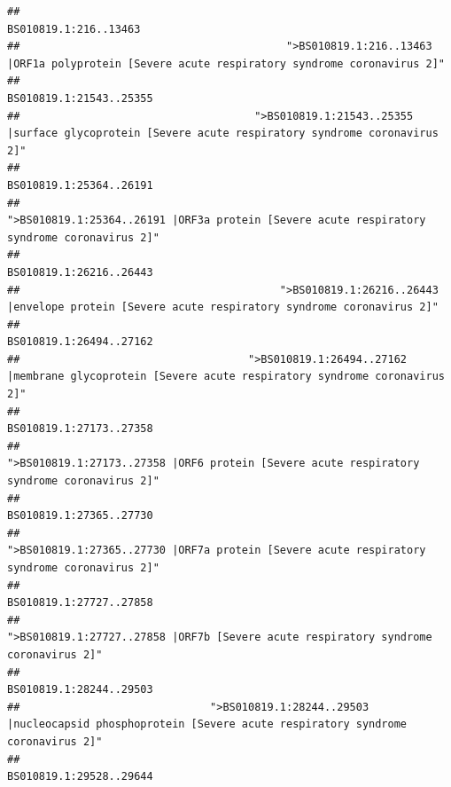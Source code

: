 \documentclass[
]{article}
\begin{document}
\begin{verbatim}
##                                                                                                                  BS010819.1:216..13463 
##                                          ">BS010819.1:216..13463 |ORF1a polyprotein [Severe acute respiratory syndrome coronavirus 2]" 
##                                                                                                                BS010819.1:21543..25355 
##                                     ">BS010819.1:21543..25355 |surface glycoprotein [Severe acute respiratory syndrome coronavirus 2]" 
##                                                                                                                BS010819.1:25364..26191 
##                                            ">BS010819.1:25364..26191 |ORF3a protein [Severe acute respiratory syndrome coronavirus 2]" 
##                                                                                                                BS010819.1:26216..26443 
##                                         ">BS010819.1:26216..26443 |envelope protein [Severe acute respiratory syndrome coronavirus 2]" 
##                                                                                                                BS010819.1:26494..27162 
##                                    ">BS010819.1:26494..27162 |membrane glycoprotein [Severe acute respiratory syndrome coronavirus 2]" 
##                                                                                                                BS010819.1:27173..27358 
##                                             ">BS010819.1:27173..27358 |ORF6 protein [Severe acute respiratory syndrome coronavirus 2]" 
##                                                                                                                BS010819.1:27365..27730 
##                                            ">BS010819.1:27365..27730 |ORF7a protein [Severe acute respiratory syndrome coronavirus 2]" 
##                                                                                                                BS010819.1:27727..27858 
##                                                    ">BS010819.1:27727..27858 |ORF7b [Severe acute respiratory syndrome coronavirus 2]" 
##                                                                                                                BS010819.1:28244..29503 
##                              ">BS010819.1:28244..29503 |nucleocapsid phosphoprotein [Severe acute respiratory syndrome coronavirus 2]" 
##                                                                                                                BS010819.1:29528..29644 

\end{verbatim}
\end{document}
